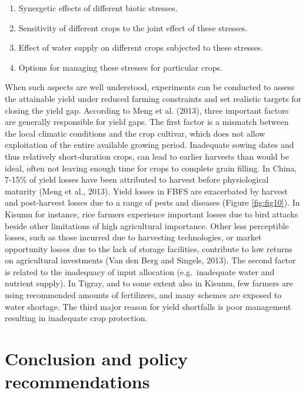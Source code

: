 \documentclass[]{elsarticle} %
\begin{document}
\begin{enumerate}
\def\labelenumi{\arabic{enumi}.}
\item
  Synergetic effects of different biotic stresses.
\item
  Sensitivity of different crops to the joint effect of these stresses.
\item
  Effect of water supply on different crops subjected to these stresses.
\item
  Options for managing these stresses for particular crops.
\end{enumerate}

When such aspects are well understood, experiments can be conducted to assess the attainable yield under reduced farming constraints and set realistic targets for closing the yield gap. According to Meng et al. (2013), three important factors are generally responsible for yield gaps. The first factor is a mismatch between the local climatic conditions and the crop cultivar, which does not allow exploitation of the entire available growing period. Inadequate sowing dates and thus relatively short-duration crops, can lead to earlier harvests than would be ideal, often not leaving enough time for crops to complete grain filling. In China, 7-15\% of yield losses have been attributed to harvest before physiological maturity (Meng et al., 2013). Yield losses in FBFS are exacerbated by harvest and post-harvest losses due to a range of pests and diseases (Figure \ref{fig:fig10}). In Kisumu for instance, rice farmers experience important losses due to bird attacks beside other limitations of high agricultural importance. Other less perceptible losses, such as those incurred due to harvesting technologies, or market opportunity losses due to the lack of storage facilities, contribute to low returns on agricultural investments (Van den Berg and Singels, 2013). The second factor is related to the inadequacy of input allocation (e.g.~inadequate water and nutrient supply). In Tigray, and to some extent also in Kisumu, few farmers are using recommended amounts of fertilizers, and many schemes are exposed to water shortage. The third major reason for yield shortfalls is poor management resulting in inadequate crop protection.

\hypertarget{conclusion-and-policy-recommendations}{%
\section{Conclusion and policy recommendations}\label{conclusion-and-policy-recommendations}}
\end{document}
